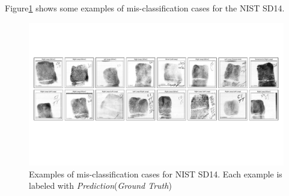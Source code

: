 \begin{table}[!ht]
	
	\centering
	\caption{ Experiment results for NIST SD14. Columns 4, 5 and 6 report the average precision, recall and F1 score for all predicted classes. }
	\label{tab.SD14_result}
\end{table}

Figure\ref{fig.fails} shows some examples of mis-classification cases for the NIST SD14.
%

\begin{figure}[!ht]
	\begin{center}
		\includegraphics[scale=0.53,clip=true,trim = 5mm 60mm 5mm 45mm]{fig/figs/fail.pdf}
	\end{center}
	\caption{Examples of mis-classification cases for NIST SD14. Each example is labeled with \textit{Prediction}(\textit{Ground Truth})} 
	\label{fig.fails}
\end{figure}

